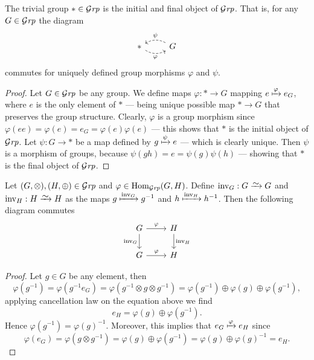 \begin{proposition}
  The trivial group \(* \in {\mathcal{G}\textit{rp}}\) is the initial and final object of \({\mathcal{G}\textit{rp}}\).
  That is, for any \(G \in {\mathcal{G}\textit{rp}}\) the diagram
  \[
    \begin{tikzcd}
      * \ar[r, dashed, bend right, swap, "\varphi"]
      &G \ar[l, dashed, bend right, swap, "\psi"]
    \end{tikzcd}
  \]
  commutes for uniquely defined group morphisms \(\varphi\) and \(\psi\).
\end{proposition}

\begin{proof}
  Let \(G \in {\mathcal{G}\textit{rp}}\) be any group. We define maps \(\varphi: * \to G\) mapping
  \(e \xmapsto\varphi e_G\), where \(e\) is the only element of \(*\) --- being
  unique possible map \(* \to G\) that preserves the group structure. Clearly,
  \(\varphi\) is a group morphism since \(\varphi(e e) = \varphi(e) = e_G =
  \varphi(e) \varphi(e)\) --- this shows that \(*\) is the initial object of
  \({\mathcal{G}\textit{rp}}\). Let \(\psi: G \to *\) be a map defined by \(g \xmapsto\psi e\) ---
  which is clearly unique. Then \(\psi\) is a morphism of groups, because
  \(\psi(g h) = e = \psi(g) \psi(h)\) --- showing that \(*\) is the final object
  of \({\mathcal{G}\textit{rp}}\).
\end{proof}

\begin{proposition}
  Let \((G, \otimes), (H, \oplus) \in {\mathcal{G}\textit{rp}}\) and \(\varphi \in \operatorname{Hom}_{\mathcal{G}\textit{rp}}(G,
  H)\). Define \(\operatorname{inv}_G: G \isoto G\) and \(\operatorname{inv}_H:
  H \isoto H\) as the maps \(g \xmapsto {\operatorname{inv}_G} g^{-1}\) and \(h
  \xmapsto {\operatorname{inv}_H} h^{-1}\). Then the following diagram commutes
  \[
    \begin{tikzcd}
      G \ar[r, "\varphi"]
      \ar[d, swap, "\operatorname{inv}_G"]
      &H \ar[d, "\operatorname{inv}_H"] \\
      G \ar[r, "\varphi"] &H
    \end{tikzcd}
  \]
\end{proposition}

\begin{proof}
  Let \(g \in G\) be any element, then
  \[
    \varphi(g^{-1}) = \varphi(g^{-1} e_G) = \varphi(g^{-1} \otimes g \otimes
    g^{-1}) = \varphi(g^{-1}) \oplus \varphi(g) \oplus \varphi(g^{-1}),
  \]
  applying cancellation law on the equation above we find
  \[
    e_H = \varphi(g) \oplus \varphi(g^{-1}).
  \]
  Hence \(\varphi(g^{-1}) = \varphi(g)^{-1}\). Moreover, this implies that \(e_G
  \xmapsto \varphi e_H\) since
  \[
    \varphi(e_G) = \varphi(g \otimes g^{-1}) = \varphi(g) \oplus \varphi(g^{-1})
    = \varphi(g) \oplus \varphi(g)^{-1} = e_H.
  \]
\end{proof}

